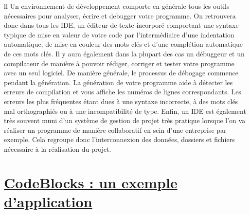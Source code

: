 \documentclass[a4paper, 12pt]{article}
\begin{document}
\begin{doublespace}ll
Un environnement de développement comporte en générale tous les outils nécessaires pour analyser, écrire et debugger votre programme. On retrouvera donc dans tous les IDE, un éditeur de texte incorporé comportant une syntaxe typique de mise en valeur de votre code par l'intermédiaire d'une indentation automatique, de mise en couleur des mots clés et d'une complétion automatique de ces mots clés. Il y aura également dans la plupart des cas un débuggeur et un compilateur de manière à pouvoir rédiger, corriger et tester votre programme avec un seul logiciel. De manière générale, le processus de débogage commence pendant la génération. La génération de votre programme  aide à détecter les erreurs de compilation et vous affiche les numéros de lignes correspondants. Les erreurs les plus fréquentes étant dues à une syntaxe incorrecte, à des mots clés mal orthographiés ou à une incompatibilité de type.  Enfin, un IDE est également très souvent muni d’un système de gestion de projet très pratique lorsque l’on va réaliser un programme de manière collaboratif en sein d’une entreprise par exemple. Cela regroupe donc  l’interconnexion des données, dossiers et fichiers nécessaire à la réalisation du projet.
\end{doublespace}

\newpage \section{\underline{CodeBlocks : un exemple d'application}}
\end{document}
